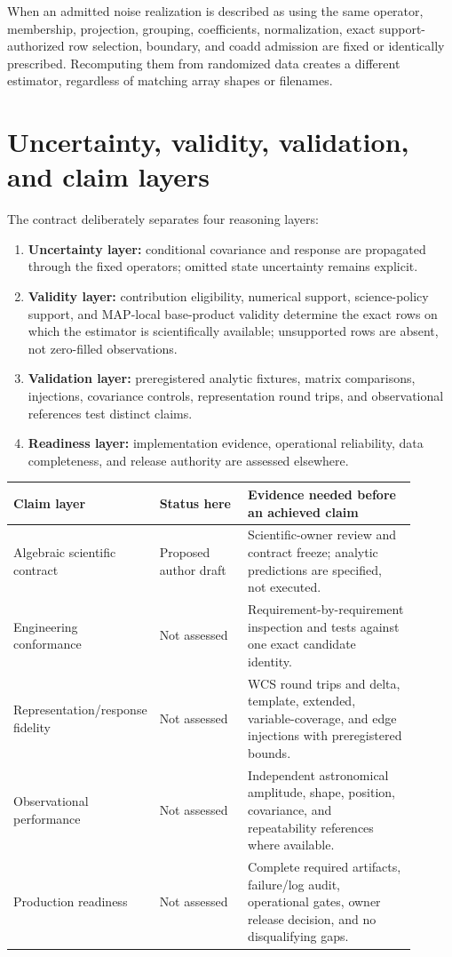 \documentclass[10pt]{article}
\newcommand{\ClaimNo}{\textcolor{MapGray}{Not assessed}}
\begin{document}
When an admitted noise realization is described as using the same operator,
membership, projection, grouping, coefficients, normalization, exact
support-authorized row selection, boundary, and coadd admission are fixed or
identically prescribed. Recomputing them from randomized data creates a
different estimator, regardless of matching array shapes or filenames.

\clearpage
\section{Uncertainty, validity, validation, and claim layers}

The contract deliberately separates four reasoning layers:

\begin{enumerate}
\item \textbf{Uncertainty layer:} conditional covariance and response are
propagated through the fixed operators; omitted state uncertainty remains
explicit.
\item \textbf{Validity layer:} contribution eligibility, numerical support,
science-policy support, and MAP-local base-product validity determine the exact rows on
which the estimator is scientifically available; unsupported rows are absent,
not zero-filled observations.
\item \textbf{Validation layer:} preregistered analytic fixtures, matrix
comparisons, injections, covariance controls, representation round trips, and
observational references test distinct claims.
\item \textbf{Readiness layer:} implementation evidence, operational
reliability, data completeness, and release authority are assessed elsewhere.
\end{enumerate}

\begin{longtable}{L{0.26\linewidth}L{0.22\linewidth}L{0.42\linewidth}}
\toprule
Claim layer & Status here & Evidence needed before an achieved claim\\
\midrule
Algebraic scientific contract & Proposed author draft & Scientific-owner
review and contract freeze; analytic predictions are specified, not executed.\\
Engineering conformance & \ClaimNo & Requirement-by-requirement inspection and
tests against one exact candidate identity.\\
Representation/response fidelity & \ClaimNo & WCS round trips and delta,
template, extended, variable-coverage, and edge injections with preregistered
bounds.\\
Observational performance & \ClaimNo & Independent astronomical amplitude,
shape, position, covariance, and repeatability references where available.\\
Production readiness & \ClaimNo & Complete required artifacts, failure/log
audit, operational gates, owner release decision, and no disqualifying gaps.\\
\bottomrule
\end{longtable}
\end{document}
